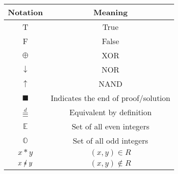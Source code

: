\documentclass[12pt]{article}
\newcommand{\nir}{\mathrel{\mathrlap{/}*}}
\begin{document}
\begin{center}
\begin{tabular}{|c|c|}
\hline
\textbf{Notation} & \textbf{Meaning}  \\
\hline

T & True  \\
F & False  \\
\(\oplus\) & XOR \\
\( \downarrow \) & NOR \\
\( \uparrow \) & NAND \\
\( \blacksquare \) & Indicates the end of proof/solution \\
\( \overset{d}{\equiv} \) & Equivalent by definition \\
\(\mathbb{E}\) & Set of all even integers \\
\(\mathbb{O}\) & Set of all odd integers \\
\( x*y \) & \( (x, y) \in R \) \\
\(x \nir y \) & \( (x, y) \notin R \) \\

\hline
\end{tabular}
\end{center}
\end{document}
